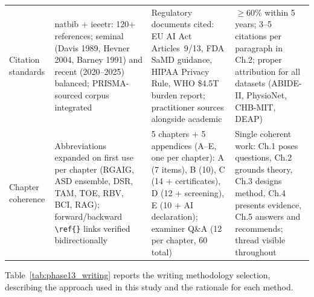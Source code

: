 \begin{xltabular}{\textwidth}{@{} p{0.11\textwidth} X X X @{}}
\addlinespace
Citation standards         & natbib + ieeetr: 120+ references; seminal (Davis 1989, Hevner 2004, Barney 1991) and recent (2020--2025) balanced; PRISMA-sourced corpus integrated & Regulatory documents cited: EU AI Act Articles~9/13, FDA SaMD guidance, HIPAA Privacy Rule, WHO \$4.5T burden report; practitioner sources alongside academic & $\geq$60\% within 5 years; 3--5 citations per paragraph in Ch.2; proper attribution for all datasets (ABIDE-II, PhysioNet, CHB-MIT, DEAP) \\
\addlinespace
Chapter coherence          & Abbreviations expanded on first use per chapter (RGAIG, ASD ensemble, DSR, TAM, TOE, RBV, BCI, RAG); forward/backward \texttt{\textbackslash ref\{\}} links verified bidirectionally & 5 chapters + 5 appendices (A--E, one per chapter): A (7 items), B (10), C (14 + certificates), D (12 + screening), E (10 + AI declaration); examiner Q\&A (12 per chapter, 60 total) & Single coherent work: Ch.1 poses questions, Ch.2 grounds theory, Ch.3 designs method, Ch.4 presents evidence, Ch.5 answers and recommends; thread visible throughout \\
\end{xltabular}
\endgroup

\vspace{1.5em}

Table~\ref{tab:phase13_writing} reports the writing methodology selection, describing the approach used in this study and the rationale for each method.

